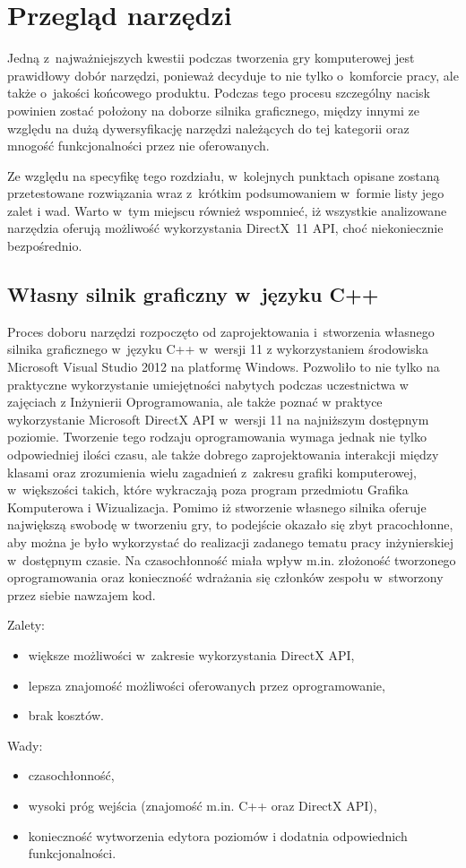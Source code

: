 
\chapter{Przegląd narzędzi}
Jedną z~najważniejszych kwestii podczas tworzenia gry komputerowej jest prawidłowy dobór narzędzi, ponieważ decyduje to nie tylko o~komforcie pracy, ale także o~jakości końcowego produktu. Podczas tego procesu szczególny nacisk powinien zostać położony na doborze silnika graficznego, między innymi ze względu na dużą dywersyfikację narzędzi należących do tej kategorii oraz mnogość funkcjonalności przez nie oferowanych.

Ze względu na specyfikę tego rozdziału, w~kolejnych punktach opisane zostaną przetestowane rozwiązania wraz z~krótkim podsumowaniem w~formie listy jego zalet i wad. Warto w~tym miejscu również wspomnieć, iż wszystkie analizowane narzędzia oferują możliwość wykorzystania DirectX~11 API, choć niekoniecznie bezpośrednio.

\section{Własny silnik graficzny w~języku C++}
Proces doboru narzędzi rozpoczęto od zaprojektowania i~stworzenia własnego silnika graficznego w~języku C++ w~wersji 11 z wykorzystaniem środowiska Microsoft Visual Studio 2012 na platformę Windows. Pozwoliło to nie tylko na praktyczne wykorzystanie umiejętności nabytych podczas uczestnictwa w zajęciach z Inżynierii Oprogramowania, ale także poznać w praktyce wykorzystanie Microsoft DirectX API w~wersji 11 na najniższym dostępnym poziomie. Tworzenie tego rodzaju oprogramowania wymaga jednak nie tylko odpowiedniej ilości czasu, ale także dobrego zaprojektowania interakcji między klasami oraz zrozumienia wielu zagadnień z~zakresu grafiki komputerowej, w~większości takich, które wykraczają poza program przedmiotu Grafika Komputerowa i Wizualizacja.
Pomimo iż stworzenie własnego silnika oferuje największą swobodę w tworzeniu gry, to podejście okazało się zbyt pracochłonne, aby można je było wykorzystać do realizacji zadanego tematu pracy inżynierskiej w~dostępnym czasie. Na czasochłonność miała wpływ m.in. złożoność tworzonego oprogramowania oraz konieczność wdrażania się członków zespołu w~stworzony przez siebie nawzajem kod.\\

{\raggedright Zalety:
\begin{itemize}
\item większe możliwości w~zakresie wykorzystania DirectX API,
\item lepsza znajomość możliwości oferowanych przez oprogramowanie,
\item brak kosztów.
\end{itemize}

Wady:
\begin{itemize}
\item czasochłonność,
\item wysoki próg wejścia (znajomość m.in. C++ oraz DirectX API),
\item konieczność wytworzenia edytora poziomów i dodatnia odpowiednich funkcjonalności.
\end{itemize}
}
